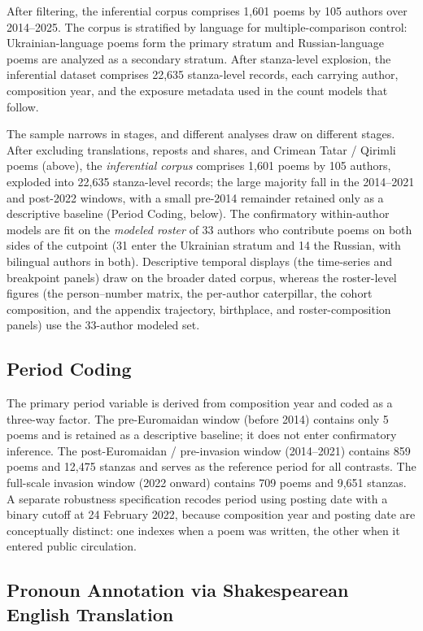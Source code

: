 \documentclass[12pt]{interact}
\theoremstyle{plain}%
\theoremstyle{definition}
\theoremstyle{remark}
\begin{document}
After filtering, the inferential corpus comprises 1{,}601 poems by 105 authors over 2014--2025. The corpus is stratified by language for multiple-comparison control: Ukrainian-language poems form the primary stratum and Russian-language poems are analyzed as a secondary stratum. After stanza-level explosion, the inferential dataset comprises 22{,}635 stanza-level records, each carrying author, composition year, and the exposure metadata used in the count models that follow.

The sample narrows in stages, and different analyses draw on different stages. After excluding translations, reposts and shares, and Crimean Tatar / Qirimli poems (above), the \emph{inferential corpus} comprises 1{,}601 poems by 105 authors, exploded into 22{,}635 stanza-level records; the large majority fall in the 2014--2021 and post-2022 windows, with a small pre-2014 remainder retained only as a descriptive baseline (Period Coding, below). The confirmatory within-author models are fit on the \emph{modeled roster} of 33 authors who contribute poems on both sides of the cutpoint (31 enter the Ukrainian stratum and 14 the Russian, with bilingual authors in both). Descriptive temporal displays (the time-series and breakpoint panels) draw on the broader dated corpus, whereas the roster-level figures (the person--number matrix, the per-author caterpillar, the cohort composition, and the appendix trajectory, birthplace, and roster-composition panels) use the 33-author modeled set.

\subsection{Period Coding}


The primary period variable is derived from composition year and coded as a three-way factor. The pre-Euromaidan window (before 2014) contains only 5 poems and is retained as a descriptive baseline; it does not enter confirmatory inference. The post-Euromaidan / pre-invasion window (2014–2021) contains 859 poems and 12,475 stanzas and serves as the reference period for all contrasts. The full-scale invasion window (2022 onward) contains 709 poems and 9,651 stanzas. A separate robustness specification recodes period using posting date with a binary cutoff at 24 February 2022, because composition year and posting date are conceptually distinct: one indexes when a poem was written, the other when it entered public circulation.

\subsection{Pronoun Annotation via Shakespearean English Translation}
\end{document}
